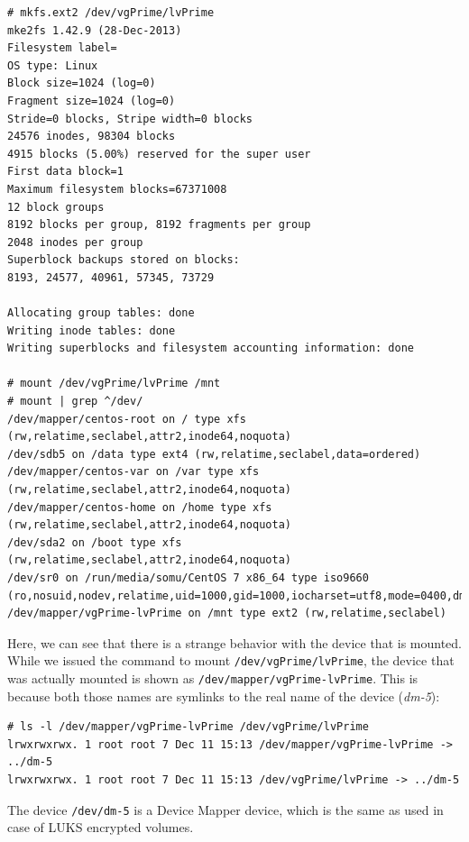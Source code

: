 \vspace{-15pt}
\begin{verbatim}
# mkfs.ext2 /dev/vgPrime/lvPrime
mke2fs 1.42.9 (28-Dec-2013)
Filesystem label=
OS type: Linux
Block size=1024 (log=0)
Fragment size=1024 (log=0)
Stride=0 blocks, Stripe width=0 blocks
24576 inodes, 98304 blocks
4915 blocks (5.00%) reserved for the super user
First data block=1
Maximum filesystem blocks=67371008
12 block groups
8192 blocks per group, 8192 fragments per group
2048 inodes per group
Superblock backups stored on blocks: 
8193, 24577, 40961, 57345, 73729

Allocating group tables: done                            
Writing inode tables: done                            
Writing superblocks and filesystem accounting information: done 

# mount /dev/vgPrime/lvPrime /mnt
# mount | grep ^/dev/
/dev/mapper/centos-root on / type xfs (rw,relatime,seclabel,attr2,inode64,noquota)
/dev/sdb5 on /data type ext4 (rw,relatime,seclabel,data=ordered)
/dev/mapper/centos-var on /var type xfs (rw,relatime,seclabel,attr2,inode64,noquota)
/dev/mapper/centos-home on /home type xfs (rw,relatime,seclabel,attr2,inode64,noquota)
/dev/sda2 on /boot type xfs (rw,relatime,seclabel,attr2,inode64,noquota)
/dev/sr0 on /run/media/somu/CentOS 7 x86_64 type iso9660 (ro,nosuid,nodev,relatime,uid=1000,gid=1000,iocharset=utf8,mode=0400,dmode=0500,uhelper=udisks2)
/dev/mapper/vgPrime-lvPrime on /mnt type ext2 (rw,relatime,seclabel)
\end{verbatim}
\vspace{-10pt}

\noindent
Here, we can see that there is a strange behavior with the device that is mounted. While we issued the command to mount \verb|/dev/vgPrime/lvPrime|, the device that was actually mounted is shown as \verb|/dev/mapper/vgPrime-lvPrime|. This is because both those names are symlinks to the real name of the device (\textit{dm-5}):

\vspace{-15pt}
\begin{verbatim}
# ls -l /dev/mapper/vgPrime-lvPrime /dev/vgPrime/lvPrime
lrwxrwxrwx. 1 root root 7 Dec 11 15:13 /dev/mapper/vgPrime-lvPrime -> ../dm-5
lrwxrwxrwx. 1 root root 7 Dec 11 15:13 /dev/vgPrime/lvPrime -> ../dm-5
\end{verbatim}
\vspace{-10pt}

\noindent
The device \verb|/dev/dm-5| is a Device Mapper device, which is the same as used in case of LUKS encrypted volumes. 

